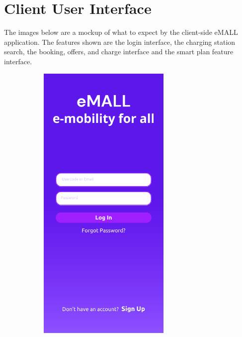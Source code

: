 \documentclass[12pt]{report}
\begin{document}
\section{Client User Interface}
The images below are a mockup of what to expect by the client-side eMALL application. The features shown are the login interface, the charging station search, the booking, offers, and charge interface and the smart plan feature interface.

\begin{figure}[h]
        \centering
        \begin{subfigure}{0.49\textwidth}
        \centering
        \includegraphics[width = 0.7\textwidth]{assets/ui1.png}
        \end{subfigure}
        \begin{subfigure}{0.49\textwidth}

\end{subfigure}
\end{figure}
\end{document}
